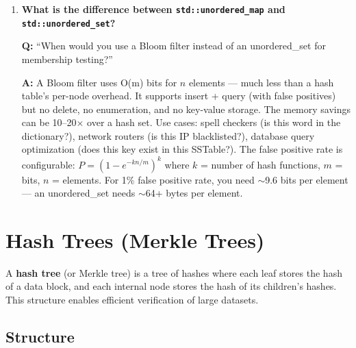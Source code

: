 \begin{enumerate}
\item \textbf{What is the difference between \texttt{std::unordered\_map} and \texttt{std::unordered\_set}?}

\textbf{Q:} ``When would you use a Bloom filter instead of an unordered\_set for membership testing?''

\textbf{A:} A Bloom filter uses O(m) bits for $n$ elements --- much less than a hash table's per-node overhead. It supports insert + query (with false positives) but no delete, no enumeration, and no key-value storage. The memory savings can be 10--20$\times$ over a hash set. Use cases: spell checkers (is this word in the dictionary?), network routers (is this IP blacklisted?), database query optimization (does this key exist in this SSTable?). The false positive rate is configurable: $P = (1 - e^{-kn/m})^{k}$ where $k$ = number of hash functions, $m$ = bits, $n$ = elements. For 1\% false positive rate, you need $\sim$9.6 bits per element --- an unordered\_set needs $\sim$64+ bytes per element.
\end{enumerate}


\section{Hash Trees (Merkle Trees)}
\label{sec:hash-trees}

A \textbf{hash tree} (or Merkle tree) is a tree of hashes where each leaf stores the hash of a data block, and each internal node stores the hash of its children's hashes. This structure enables efficient verification of large datasets.

\subsection{Structure}

